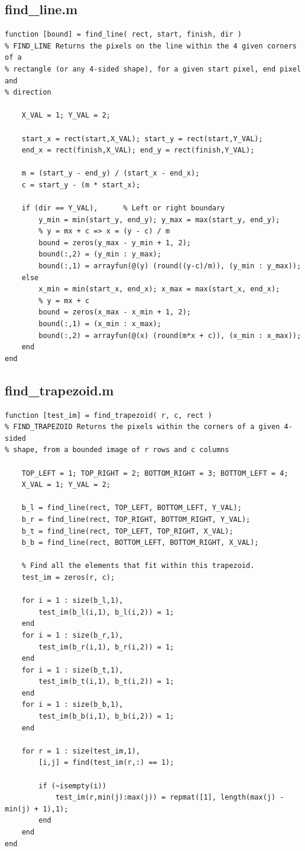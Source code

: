 \documentclass[11pt]{article}
\begin{document}
\subsection{find\_line.m}
\begin{verbatim}
function [bound] = find_line( rect, start, finish, dir )
% FIND_LINE Returns the pixels on the line within the 4 given corners of a 
% rectangle (or any 4-sided shape), for a given start pixel, end pixel and 
% direction 

    X_VAL = 1; Y_VAL = 2;

    start_x = rect(start,X_VAL); start_y = rect(start,Y_VAL);
    end_x = rect(finish,X_VAL); end_y = rect(finish,Y_VAL);

    m = (start_y - end_y) / (start_x - end_x);
    c = start_y - (m * start_x);

    if (dir == Y_VAL),      % Left or right boundary
        y_min = min(start_y, end_y); y_max = max(start_y, end_y);
        % y = mx + c => x = (y - c) / m
        bound = zeros(y_max - y_min + 1, 2);
        bound(:,2) = (y_min : y_max);
        bound(:,1) = arrayfun(@(y) (round((y-c)/m)), (y_min : y_max));  
    else
        x_min = min(start_x, end_x); x_max = max(start_x, end_x);
        % y = mx + c 
        bound = zeros(x_max - x_min + 1, 2);
        bound(:,1) = (x_min : x_max);
        bound(:,2) = arrayfun(@(x) (round(m*x + c)), (x_min : x_max));  
    end
end
\end{verbatim}

\subsection{find\_trapezoid.m}
\begin{verbatim}
function [test_im] = find_trapezoid( r, c, rect )
% FIND_TRAPEZOID Returns the pixels within the corners of a given 4-sided
% shape, from a bounded image of r rows and c columns 

    TOP_LEFT = 1; TOP_RIGHT = 2; BOTTOM_RIGHT = 3; BOTTOM_LEFT = 4;
    X_VAL = 1; Y_VAL = 2;

    b_l = find_line(rect, TOP_LEFT, BOTTOM_LEFT, Y_VAL);
    b_r = find_line(rect, TOP_RIGHT, BOTTOM_RIGHT, Y_VAL);
    b_t = find_line(rect, TOP_LEFT, TOP_RIGHT, X_VAL);
    b_b = find_line(rect, BOTTOM_LEFT, BOTTOM_RIGHT, X_VAL);

    % Find all the elements that fit within this trapezoid.
    test_im = zeros(r, c);

    for i = 1 : size(b_l,1),
        test_im(b_l(i,1), b_l(i,2)) = 1;
    end
    for i = 1 : size(b_r,1),
        test_im(b_r(i,1), b_r(i,2)) = 1;
    end
    for i = 1 : size(b_t,1),
        test_im(b_t(i,1), b_t(i,2)) = 1;
    end
    for i = 1 : size(b_b,1),
        test_im(b_b(i,1), b_b(i,2)) = 1;
    end

    for r = 1 : size(test_im,1),
        [i,j] = find(test_im(r,:) == 1);

        if (~isempty(i))
            test_im(r,min(j):max(j)) = repmat([1], length(max(j) - min(j) + 1),1);
        end  
    end
end
\end{verbatim}
\end{document}

